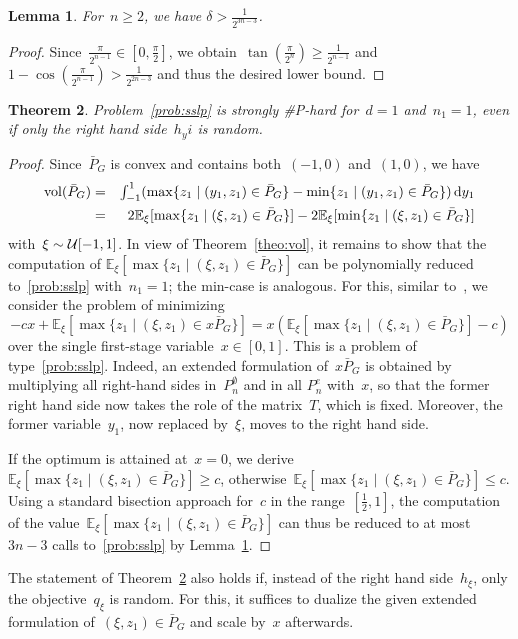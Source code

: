 \documentclass{article}
\newtheorem{theorem}{Theorem}
\newtheorem{lemma}[theorem]{Lemma}
\newcommand{\card}{\#}
\newcommand{\E}{\mathbb{E}}
\renewcommand{\d}{\,\textnormal{d}}
\DeclareMathOperator{\vol}{vol}
\begin{document}
\begin{lemma}\label{lem:prec}
  For~$n\ge 2$, we have $\delta>\tfrac 1{2^{3n-3}}$.
\end{lemma}
\begin{proof}
  Since~$\tfrac\pi{2^{n-1}}\in [0,\tfrac\pi 2]$, we
  obtain~$\tan(\tfrac\pi{2^n})\ge\tfrac 1{2^{n-1}}$
  and~$1-\cos(\tfrac\pi{2^{n-1}})> \tfrac 1{2^{2n-3}}$ and thus the
  desired lower bound.
\end{proof}
\begin{theorem}\label{theo:small_d}
  Problem~\eqref{prob:sslp} is strongly \card P-hard for~$d=1$
  and~$n_1=1$, even if only the right hand side~$h_yi$ is random.
\end{theorem}
\begin{proof}
  Since~$\bar P_G$ is convex and contains both~$(-1,0)$ and~$(1,0)$,
  we have
  \begin{eqnarray*}
    \vol(\bar P_G)
    & = & \textstyle \int_{-1}^1 (\max\{z_1\mid (y_1,z_1)\in \bar P_G\}-\min\{z_1\mid (y_1,z_1)\in \bar P_G\}) \d y_1\\
    & = & 2\E_\xi[\max\{z_1\mid (\xi,z_1)\in \bar P_G\}]-2\E_\xi[\min\{z_1\mid (\xi,z_1)\in \bar P_G\}]
  \end{eqnarray*}
  with~$\xi\sim{\cal U}[-1,1]$. In view of Theorem~\ref{theo:vol}, it
  remains to show that the computation of $\E_\xi[\max\{z_1\mid
    (\xi,z_1)\in \bar P_G\}]$ can be polynomially reduced
  to~\eqref{prob:sslp} with~$n_1=1$; the min-case is analogous.  For
  this, similar to~\cite{Hanasusanto16}, we consider the problem of
  minimizing
  \[
  -cx+\E_\xi[\max\{z_1\mid (\xi,z_1)\in x\bar
    P_G\}]=x(\E_\xi[\max\{z_1\mid (\xi,z_1)\in \bar P_G\}]-c)
  \]
  over
  the single first-stage variable~$x\in [0,1]$. This is a problem of
  type~\eqref{prob:sslp}. Indeed, an extended formulation of~$x\bar
  P_G$ is obtained by multiplying all right-hand sides
  in~$P_n^\emptyset$ and in all $P_n^e$ with~$x$, so that the former
  right hand side now takes the role of the matrix~$T$, which is
  fixed. Moreover, the former variable~$y_1$, now replaced by~$\xi$,
  moves to the right hand side.
  
  If the optimum is attained at~$x=0$, we derive~$\E_\xi[\max\{z_1\mid
    (\xi,z_1)\in \bar P_G\}]\ge c$, otherwise~$\E_\xi[\max\{z_1\mid
    (\xi,z_1)\in \bar P_G\}]\le c$. Using a standard bisection
  approach for~$c$ in the range~$[\tfrac 12,1]$, the computation of
  the value~$\E_\xi[\max\{z_1\mid (\xi,z_1)\in \bar P_G\}]$ can thus
  be reduced to at most~$3n-3$ calls to~\eqref{prob:sslp} by
  Lemma~\ref{lem:prec}.
\end{proof}
The statement of Theorem~\ref{theo:small_d} also holds if, instead of
the right hand side~$h_\xi$, only the objective~$q_\xi$ is random. For
this, it suffices to dualize the given extended formulation
of~$(\xi,z_1)\in \bar P_G$ and scale by~$x$ afterwards.
\end{document}
